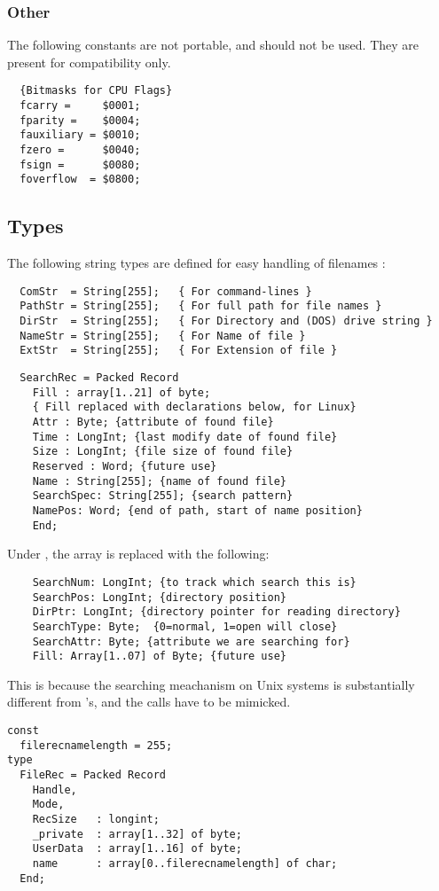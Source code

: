 \subsubsection{Other}

The following constants are not portable, and should not be used. They
are present for compatibility only.

\begin{verbatim}
  {Bitmasks for CPU Flags}
  fcarry =     $0001;
  fparity =    $0004;
  fauxiliary = $0010;
  fzero =      $0040;
  fsign =      $0080;
  foverflow  = $0800;
\end{verbatim}  
  
\subsection{Types}
The following string types are defined for easy handling of
filenames :
\begin{verbatim}
  ComStr  = String[255];   { For command-lines } 
  PathStr = String[255];   { For full path for file names }
  DirStr  = String[255];   { For Directory and (DOS) drive string }
  NameStr = String[255];   { For Name of file }
  ExtStr  = String[255];   { For Extension of file }
\end{verbatim}
\begin{verbatim}
  SearchRec = Packed Record
    Fill : array[1..21] of byte;  
    { Fill replaced with declarations below, for Linux}
    Attr : Byte; {attribute of found file}
    Time : LongInt; {last modify date of found file}
    Size : LongInt; {file size of found file}
    Reserved : Word; {future use}
    Name : String[255]; {name of found file}
    SearchSpec: String[255]; {search pattern}
    NamePos: Word; {end of path, start of name position}
    End;
\end{verbatim}
Under \linux, the  array is replaced with the following:
\begin{verbatim}
    SearchNum: LongInt; {to track which search this is}
    SearchPos: LongInt; {directory position}
    DirPtr: LongInt; {directory pointer for reading directory}
    SearchType: Byte;  {0=normal, 1=open will close}
    SearchAttr: Byte; {attribute we are searching for}
    Fill: Array[1..07] of Byte; {future use}
\end{verbatim}
This is because the searching meachanism on Unix systems is substantially
different from \dos's, and the calls have to be mimicked.
\begin{verbatim}
const
  filerecnamelength = 255;
type
  FileRec = Packed Record
    Handle,
    Mode,  
    RecSize   : longint;
    _private  : array[1..32] of byte;
    UserData  : array[1..16] of byte;
    name      : array[0..filerecnamelength] of char;
  End;
\end{verbatim}

